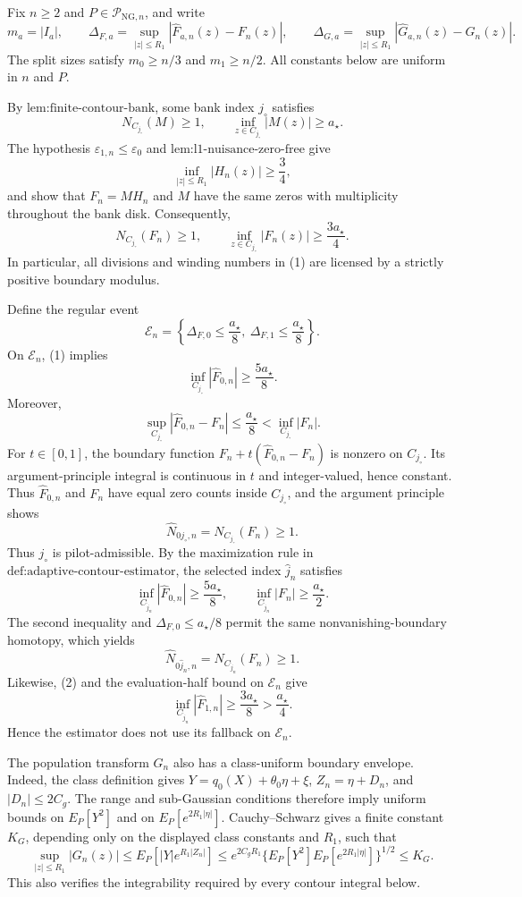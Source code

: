 Fix \(n\ge2\) and \(P\in\mathcal P_{\mathrm{NG},n}\), and write
\[
 m_a=|I_a|,
 \qquad
 \Delta_{F,a}=\sup_{|z|\le R_1}|\widehat F_{a,n}(z)-F_n(z)|,
 \qquad
 \Delta_{G,a}=\sup_{|z|\le R_1}|\widehat G_{a,n}(z)-G_n(z)|.
\]
The split sizes satisfy \(m_0\ge n/3\) and \(m_1\ge n/2\).  All constants below are uniform in \(n\) and \(P\).

By \(\text{lem:finite-contour-bank}\), some bank index \(j_{\circ}\) satisfies
\[
 N_{C_{j_{\circ}}}(M)\ge1,
 \qquad
 \inf_{z\in C_{j_{\circ}}}|M(z)|\ge a_{\star}.
\]
The hypothesis \(\varepsilon_{1,n}\le\varepsilon_0\) and
\(\text{lem:l1-nuisance-zero-free}\) give
\[
 \inf_{|z|\le R_1}|H_n(z)|\ge\frac34,
\]
and show that \(F_n=M H_n\) and \(M\) have the same zeros with multiplicity throughout the bank disk.  Consequently,
\[
 N_{C_{j_{\circ}}}(F_n)\ge1,
 \qquad
 \inf_{z\in C_{j_{\circ}}}|F_n(z)|\ge\frac{3a_{\star}}4. \tag{1}
\]
In particular, all divisions and winding numbers in (1) are licensed by a strictly positive boundary modulus.

Define the regular event
\[
 \mathcal E_n
 =\left\{\Delta_{F,0}\le\frac{a_{\star}}8,
              \ \Delta_{F,1}\le\frac{a_{\star}}8\right\}.
\]
On \(\mathcal E_n\), (1) implies
\[
 \inf_{C_{j_{\circ}}}|\widehat F_{0,n}|
 \ge\frac{5a_{\star}}8.
\]
Moreover,
\[
 \sup_{C_{j_{\circ}}}|\widehat F_{0,n}-F_n|
 \le\frac{a_{\star}}8
 <\inf_{C_{j_{\circ}}}|F_n|.
\]
For \(t\in[0,1]\), the boundary function
\(F_n+t(\widehat F_{0,n}-F_n)\) is nonzero on
\(C_{j_{\circ}}\).  Its argument-principle integral is continuous in \(t\) and integer-valued, hence constant.  Thus \(\widehat F_{0,n}\) and \(F_n\) have equal zero counts inside \(C_{j_{\circ}}\), and the argument principle shows
\[
 \widehat N_{0j_{\circ},n}=N_{C_{j_{\circ}}}(F_n)\ge1.
\]
Thus \(j_{\circ}\) is pilot-admissible.  By the maximization rule in
\(\text{def:adaptive-contour-estimator}\), the selected index \(\widehat j_n\) satisfies
\[
 \inf_{C_{\widehat j_n}}|\widehat F_{0,n}|
 \ge\frac{5a_{\star}}8,
 \qquad
 \inf_{C_{\widehat j_n}}|F_n|
 \ge\frac{a_{\star}}2. \tag{2}
\]
The second inequality and \(\Delta_{F,0}\le a_{\star}/8\) permit the same nonvanishing-boundary homotopy, which yields
\[
 \widehat N_{0\widehat j_n,n}
 =N_{C_{\widehat j_n}}(F_n)\ge1. \tag{3}
\]
Likewise, (2) and the evaluation-half bound on \(\mathcal E_n\) give
\[
 \inf_{C_{\widehat j_n}}|\widehat F_{1,n}|
 \ge\frac{3a_{\star}}8>\frac{a_{\star}}4. \tag{4}
\]
Hence the estimator does not use its fallback on \(\mathcal E_n\).

The population transform \(G_n\) also has a class-uniform boundary envelope.  Indeed, the class definition gives
\(Y=q_0(X)+\theta_0\eta+\xi\), \(Z_n=\eta+D_n\), and \(|D_n|\le2C_g\).  The range and sub-Gaussian conditions therefore imply uniform bounds on \(E_P[Y^2]\) and on \(E_P[e^{2R_1|\eta|}]\).  Cauchy--Schwarz gives a finite constant \(K_G\), depending only on the displayed class constants and \(R_1\), such that
\[
 \sup_{|z|\le R_1}|G_n(z)|
 \le E_P[|Y|e^{R_1|Z_n|}]
 \le e^{2C_gR_1}\{E_P[Y^2]E_P[e^{2R_1|\eta|}]\}^{1/2}
 \le K_G. \tag{5}
\]
This also verifies the integrability required by every contour integral below.

